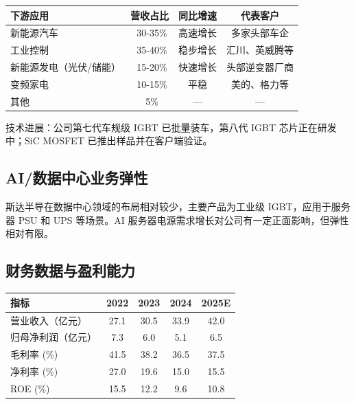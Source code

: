 \begin{exhibitbox}[表 6-3：斯达半导下游结构（估算）]
\centering
\small
\begin{tabularx}{\textwidth}{X c c c}
\toprule
\textbf{下游应用} & \textbf{营收占比} & \textbf{同比增速} & \textbf{代表客户} \\
\midrule
新能源汽车 & ~30-35\% & 高速增长 & 多家头部车企 \\
工业控制 & ~35-40\% & 稳步增长 & 汇川、英威腾等 \\
新能源发电（光伏/储能） & ~15-20\% & 快速增长 & 头部逆变器厂商 \\
变频家电 & ~10-15\% & 平稳 & 美的、格力等 \\
其他 & ~5\% & — & — \\
\bottomrule
\end{tabularx}
\end{exhibitbox}

技术进展：公司第七代车规级 IGBT 已批量装车，第八代 IGBT 芯片正在研发中；SiC MOSFET 已推出样品并在客户端验证。

\subsection{AI/数据中心业务弹性}

斯达半导在数据中心领域的布局相对较少，主要产品为工业级 IGBT，应用于服务器 PSU 和 UPS 等场景。AI 服务器电源需求增长对公司有一定正面影响，但弹性相对有限。

\subsection{财务数据与盈利能力}

\begin{exhibitbox}[表 6-4：斯达半导核心财务数据]
\centering
\small
\begin{tabularx}{\textwidth}{X c c c c}
\toprule
\textbf{指标} & \textbf{2022} & \textbf{2023} & \textbf{2024} & \textbf{2025E} \\
\midrule
营业收入（亿元） & 27.1 & 30.5 & 33.9 & 42.0 \\
归母净利润（亿元） & 7.3 & 6.0 & 5.1 & 6.5 \\
毛利率 (\%) & 41.5 & 38.2 & 36.5 & 37.5 \\
净利率 (\%) & 27.0 & 19.6 & 15.0 & 15.5 \\
ROE (\%) & 15.5 & 12.2 & 9.6 & 10.8 \\
\bottomrule
\end{tabularx}
\end{exhibitbox}

